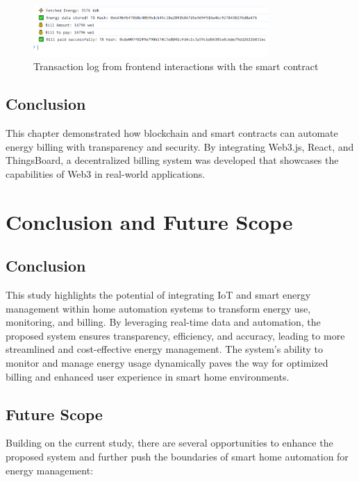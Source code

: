 \documentclass[a4paper,12pt]{report}
\begin{document}
 \begin{figure}[H]
 \centering
 \includegraphics[width=0.8\textwidth]{frontend Logs.PNG}
 \caption{Transaction log from frontend interactions with the smart contract}
 \label{fig:frontend_transactions}
 \end{figure}
 
 \section{Conclusion}
 This chapter demonstrated how blockchain and smart contracts can automate energy billing with transparency and security. By integrating Web3.js, React, and ThingsBoard, a decentralized billing system was developed that showcases the capabilities of Web3 in real-world applications.
 
 \chapter{Conclusion and Future Scope}

 \section{Conclusion}
 This study highlights the potential of integrating IoT and smart energy management within home automation systems to transform energy use, monitoring, and billing. By leveraging real-time data and automation, the proposed system ensures transparency, efficiency, and accuracy, leading to more streamlined and cost-effective energy management. The system’s ability to monitor and manage energy usage dynamically paves the way for optimized billing and enhanced user experience in smart home environments.
 
 \section{Future Scope}
 Building on the current study, there are several opportunities to enhance the proposed system and further push the boundaries of smart home automation for energy management:
 
\end{document}

